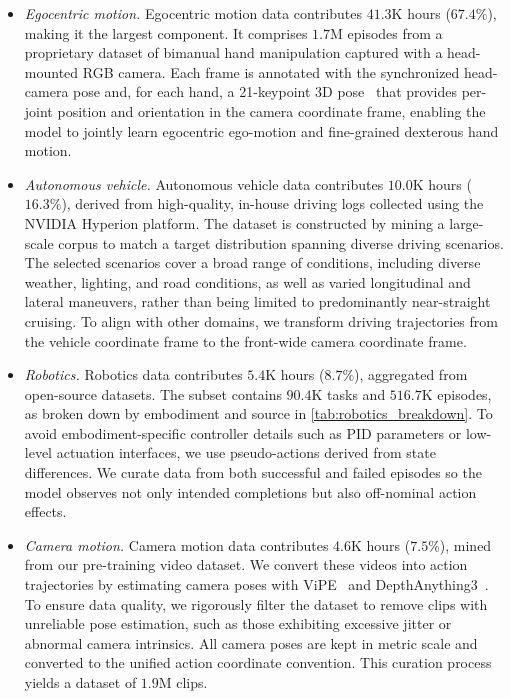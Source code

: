 \documentclass{llmxive}
\begin{document}
\begin{itemize}
  \item \textit{Egocentric motion.} Egocentric motion data contributes $41.3$K hours ($67.4\%$), making it the largest component. It comprises $1.7$M episodes from a proprietary dataset of bimanual hand manipulation captured with a head-mounted RGB camera.   Each frame is annotated with the synchronized head-camera pose and, for each hand, a 21-keypoint 3D pose~\citep{zimmermann2017learning,simon2017hand} that provides per-joint position and orientation in the camera coordinate frame, enabling the model to jointly learn egocentric ego-motion and fine-grained dexterous hand motion.
  \item \textit{Autonomous vehicle.} Autonomous vehicle data contributes $10.0$K hours ($16.3\%$), derived from high-quality, in-house driving logs collected using the NVIDIA Hyperion platform. The dataset is constructed by mining a large-scale corpus to match a target distribution spanning diverse driving scenarios. The selected scenarios cover a broad range of conditions, including diverse weather, lighting, and road conditions, as well as varied longitudinal and lateral maneuvers, rather than being limited to predominantly near-straight cruising. To align with other domains, we transform driving trajectories from the vehicle coordinate frame to the front-wide camera coordinate frame.
  \item \textit{Robotics.} Robotics data contributes $5.4$K hours ($8.7\%$), aggregated from open-source datasets. The subset contains $90.4$K tasks and $516.7$K episodes, as broken down by embodiment and source in \cref{tab:robotics_breakdown}. To avoid embodiment-specific controller details such as PID parameters or low-level actuation interfaces, we use pseudo-actions derived from state differences. We curate data from both successful and failed episodes so the model observes not only intended completions but also off-nominal action effects.
  \item \textit{Camera motion.} Camera motion data contributes $4.6$K hours ($7.5\%$), mined from our pre-training video dataset. We convert these videos into action trajectories by estimating camera poses with ViPE~\citep{huang2025vipe} and DepthAnything3~\citep{lin2025depthanything3}. To ensure data quality, we rigorously filter the dataset to remove clips with unreliable pose estimation, such as those exhibiting excessive jitter or abnormal camera intrinsics. All camera poses are kept in metric scale and converted to the unified action coordinate convention.
  This curation process yields a dataset of $1.9$M clips.
\end{itemize}
\end{document}
